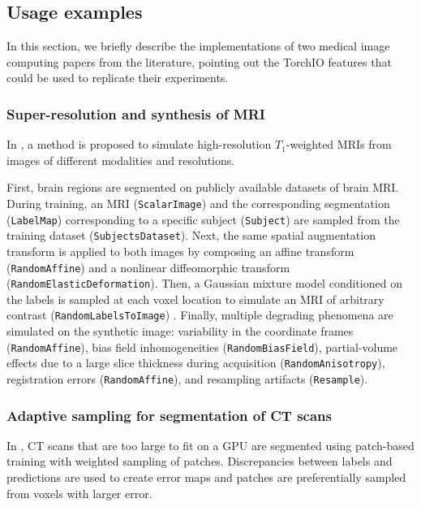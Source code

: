 \subsection{Usage examples}

In this section, we briefly describe the implementations of two medical image computing papers from the literature, pointing out the TorchIO features that could be used to replicate their experiments.


\subsubsection{Super-resolution and synthesis of MRI}

In \cite{iglesias_joint_2020}, a method is proposed to simulate high-resolution $T_1$-weighted \acp{MRI} from images of different modalities and resolutions.

First, brain regions are segmented on publicly available datasets of brain \ac{MRI}.
During training, an \ac{MRI} (\texttt{ScalarImage}) and the corresponding segmentation (\texttt{LabelMap}) corresponding to a specific subject (\texttt{Subject}) are sampled from the training dataset (\texttt{SubjectsDataset}).
Next, the same spatial augmentation transform is applied to both images by composing an affine transform (\texttt{RandomAffine}) and a nonlinear diffeomorphic transform (\texttt{RandomElasticDeformation}).
Then, a Gaussian mixture model conditioned on the labels is sampled at each voxel location to simulate an \ac{MRI} of arbitrary contrast (\texttt{RandomLabelsToImage}) \cite{billot_learning_2020}.
Finally, multiple degrading phenomena are simulated on the synthetic image: variability in the coordinate frames (\texttt{RandomAffine}), bias field inhomogeneities (\texttt{RandomBiasField}),
partial-volume effects due to a large slice thickness during acquisition \cite{billot_partial_2020} (\texttt{RandomAnisotropy}), registration errors (\texttt{RandomAffine}), and resampling artifacts (\texttt{Resample}).


\subsubsection{Adaptive sampling for segmentation of CT scans}

In \cite{berger_adaptive_2018}, \ac{CT} scans that are too large to fit on a \ac{GPU} are segmented using patch-based training with weighted sampling of patches.
Discrepancies between labels and predictions are used to create error maps and patches are preferentially sampled from voxels with larger error.

